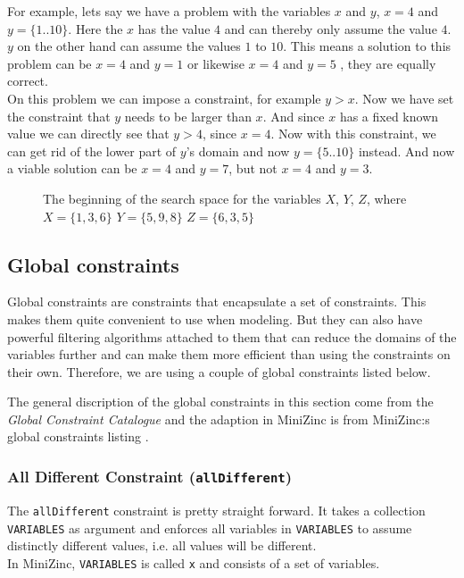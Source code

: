 For example, lets say we have a problem with the variables $x$ and $y$, $x = 4$ and $y = \{1..10\}$. Here the $x$ has the value $4$ and can thereby only assume the value $4$. $y$ on the other hand can assume the values $1$ to $10$. This means a solution to this problem can be $x = 4$ and $y = 1$ or likewise $x = 4$ and $y = 5$ , they are equally correct.\\
On this problem we can impose a constraint, for example $y > x$. Now we have set the constraint that $y$ needs to be larger than $x$. And since $x$ has a fixed known value we can directly see that $y > 4$, since $x = 4$. Now with this constraint, we can get rid of the lower part of $y$'s domain and now $y = \{5..10\}$ instead. And now a viable solution can be $x = 4$ and $y = 7$, but not $x = 4$ and $y = 3$.

\begin{figure}
  \caption{The beginning of the search space for the variables $X$, $Y$, $Z$, where $X=\{1,3,6\}$ $Y=\{5,9,8\}$ $Z=\{6,3,5\}$}
  \label{fig:search_space}
\end{figure}

\subsection{Global constraints}
Global constraints are constraints that encapsulate a set of constraints. This makes them quite convenient to use when modeling. But they can also have powerful filtering algorithms attached to them that can reduce the domains of the variables further and can make them more efficient than using the constraints on their own.\cite{global_constraints} Therefore, we are using a couple of global constraints listed below.

The general discription of the global constraints in this section come from the \emph{Global Constraint Catalogue} \cite{global_constraint_catalogue} and the adaption in MiniZinc is from MiniZinc:s global constraints listing \cite{mz_global_constraints}.

\subsubsection{All Different Constraint (\texttt{allDifferent})}
The \texttt{allDifferent} constraint is pretty straight forward. It takes a collection \texttt{VARIABLES} as argument and enforces all variables in \texttt{VARIABLES} to assume distinctly different values, i.e. all values will be different.
\\
In MiniZinc, \texttt{VARIABLES} is called \texttt{x} and consists of a set of variables.

